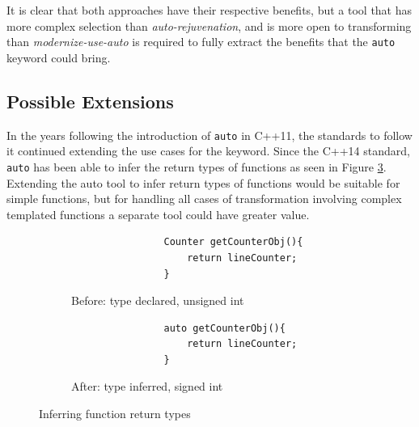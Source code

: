 \documentclass[bsc,frontabs,singlespacing,twoside,parskip,deptreport]{infthesis}
\begin{document}
It is clear that both approaches have their respective benefits, but a tool that has more complex selection than \textit{auto-rejuvenation}, and is more open to transforming than \textit{modernize-use-auto} is required to fully extract the benefits that the \texttt{auto} keyword could bring.



\subsection{Possible Extensions}
In the years following the introduction of \texttt{auto} in C++11, the standards to follow it continued extending the use cases for the keyword. Since the C++14 standard, \texttt{auto} has been able to infer the return types of functions as seen in Figure \ref{fig:funct-ret-inferred}. Extending the auto tool to infer return types of functions would be suitable for simple functions, but for handling all cases of transformation involving complex templated functions a separate tool could have greater value.

\begin{figure}[!h]
    \centering
    \begin{subfigure}[h]{\textwidth}
        \centering
        \begin{verbatim}
                Counter getCounterObj(){
                    return lineCounter;
                }
        \end{verbatim}
        \caption{Before: type declared, unsigned int}
        \label{fig:funct-ret-inferred-before}
        \vspace{0.40cm}
    \end{subfigure}
    \begin{subfigure}[h]{\textwidth}
        \centering
        \begin{verbatim}
                auto getCounterObj(){
                    return lineCounter;
                }
        \end{verbatim}
        \caption{After: type inferred, signed int}
        \label{fig:funct-ret-inferred-after}
    \end{subfigure}
    \caption{Inferring function return types}
    \label{fig:funct-ret-inferred}
\end{figure}
\end{document}
